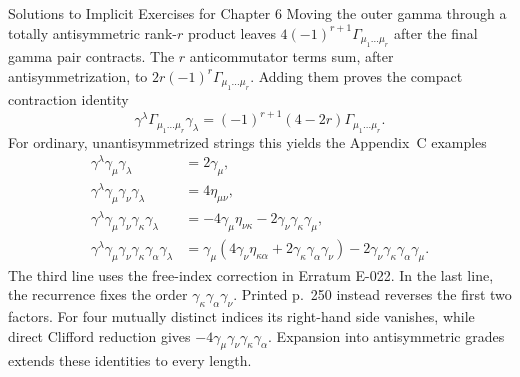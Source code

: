 \begin{bankssolutions}{Solutions to Implicit Exercises for Chapter 6}
Moving the outer gamma through a totally antisymmetric rank-\(r\) product
leaves \(4(-1)^{r+1}\Gamma_{\mu_1\ldots\mu_r}\) after the final gamma pair
contracts.  The \(r\) anticommutator terms sum, after antisymmetrization, to
\(2r(-1)^r\Gamma_{\mu_1\ldots\mu_r}\).  Adding them proves the compact
contraction identity
\begin{equation*}
 \gamma^\lambda\Gamma_{\mu_1\ldots\mu_r}\gamma_\lambda
 =(-1)^{r+1}(4-2r)\Gamma_{\mu_1\ldots\mu_r}.
\end{equation*}
For ordinary, unantisymmetrized strings this yields the Appendix~C examples
\begin{align*}
 \gamma^\lambda\gamma_\mu\gamma_\lambda&=2\gamma_\mu,\\
 \gamma^\lambda\gamma_\mu\gamma_\nu\gamma_\lambda&=4\eta_{\mu\nu},\\
 \gamma^\lambda\gamma_\mu\gamma_\nu\gamma_\kappa\gamma_\lambda
 &=-4\gamma_\mu\eta_{\nu\kappa}
   -2\gamma_\nu\gamma_\kappa\gamma_\mu,\\
 \gamma^\lambda\gamma_\mu\gamma_\nu\gamma_\kappa\gamma_\alpha
 \gamma_\lambda
 &=\gamma_\mu\left(4\gamma_\nu\eta_{\kappa\alpha}
   +2\gamma_\kappa\gamma_\alpha\gamma_\nu\right)
   -2\gamma_\nu\gamma_\kappa\gamma_\alpha\gamma_\mu.
\end{align*}
The third line uses the free-index correction in Erratum E-022.  In the last
line, the recurrence fixes the order
\(\gamma_\kappa\gamma_\alpha\gamma_\nu\).  Printed p.~250 instead reverses
the first two factors.  For four mutually distinct indices its right-hand
side vanishes, while direct Clifford reduction gives
\(-4\gamma_\mu\gamma_\nu\gamma_\kappa\gamma_\alpha\).
Expansion into antisymmetric grades extends these identities to every
length.


\end{bankssolutions}
